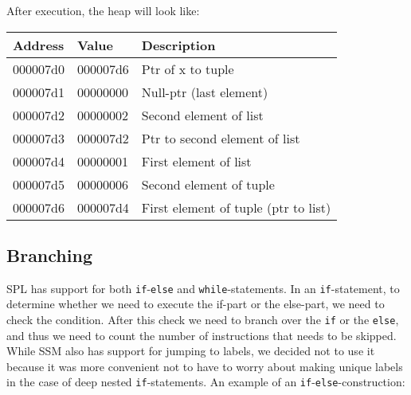 \documentclass[a4paper]{article}
\begin{document}
After execution, the heap will look like:

\begin{tabular}{|l|l|l|}
        \hline
        Address & Value & Description \\
        \hline
        000007d0 & 000007d6 & Ptr of x to tuple \\
        000007d1 & 00000000 & Null-ptr (last element) \\
        000007d2 & 00000002 & Second element of list \\
        000007d3 & 000007d2 & Ptr to second element of list \\
        000007d4 & 00000001 & First element of list \\
        000007d5 & 00000006 & Second element of tuple \\
        000007d6 & 000007d4 & First element of tuple (ptr to list) \\
        \hline
\end{tabular}

\subsection{Branching}
SPL has support for both {\tt if}-{\tt else} and {\tt while}-statements. In an {\tt if}-statement, to determine whether we need to execute the if-part or the else-part, we need to check the condition. After this check we need to branch over the {\tt if} or the {\tt else}, and thus we need to count the number of instructions that needs to be skipped. While SSM also has support for jumping to labels, we decided not to use it because it was more convenient not to have to worry about making unique labels in the case of deep nested {\tt if}-statements. An example of an {\tt if}-{\tt else}-construction:
\end{document}
